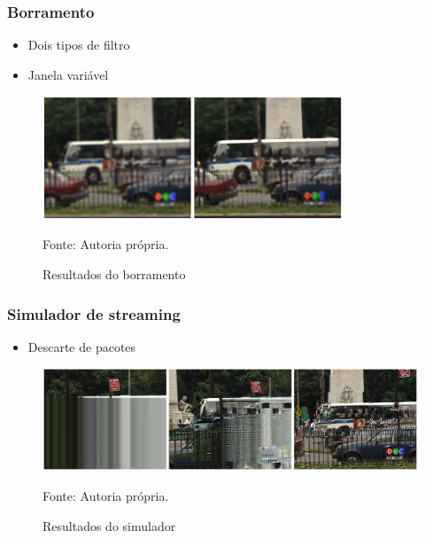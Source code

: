 	\begin{frame}\frametitle{Borramento}
		\begin{itemize}
			\item Dois tipos de filtro
			\item Janela variável
		\end{itemize}

		\begin{figure}
			\includegraphics[width=0.8\textwidth]{./imgs/blur.png}
			\caption{Resultados do borramento}
			\tiny
			Fonte: Autoria própria.
		\end{figure}

    \end{frame}
	
	\begin{frame}\frametitle{Simulador de streaming}
		\begin{itemize}
			\item Descarte de pacotes
		\end{itemize}

		\begin{figure}
			\includegraphics[width=1\textwidth]{./imgs/net.png}
			\caption{Resultados do simulador}
			\tiny
			Fonte: Autoria própria.
		\end{figure}

    \end{frame}
		
